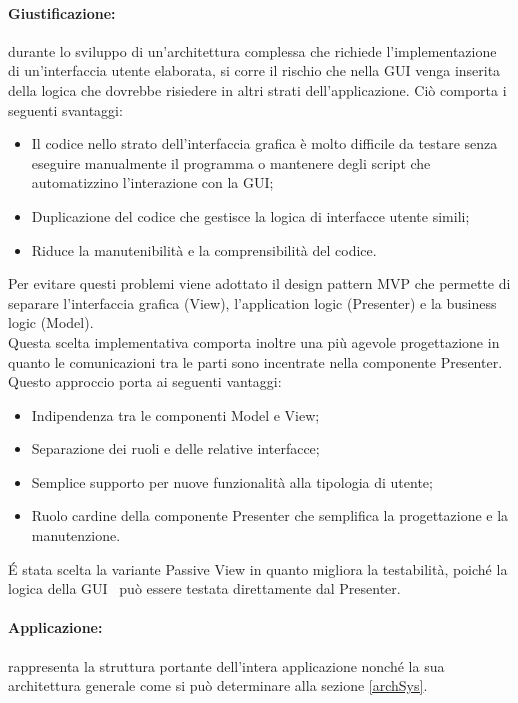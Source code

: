 {{	\paragraph{Giustificazione: }{
	durante lo sviluppo di un'architettura complessa che richiede l'implementazione di un'interfaccia utente elaborata, si corre il rischio che nella GUI venga inserita della logica che dovrebbe risiedere in altri strati dell'applicazione. Ciò comporta i seguenti svantaggi:
	\begin{itemize}
		\item Il codice nello strato dell'interfaccia grafica è molto difficile da testare senza eseguire manualmente il programma o mantenere degli script che automatizzino l'interazione con la GUI\g ;
		\item Duplicazione del codice che gestisce la logica di interfacce utente simili;
		\item Riduce la manutenibilità e la comprensibilità del codice.
	\end{itemize}
Per evitare questi problemi viene adottato il design pattern MVP che permette di separare l'interfaccia grafica (View), l'application logic (Presenter) e la business logic (Model).\\
Questa scelta implementativa comporta inoltre una più agevole progettazione in quanto le comunicazioni tra le parti sono incentrate nella componente Presenter. Questo approccio porta ai seguenti vantaggi:
\begin{itemize}
	\item Indipendenza tra le componenti Model e View;	
	\item Separazione dei ruoli e delle relative interfacce;
	\item Semplice supporto per nuove funzionalità alla tipologia di utente;
	\item Ruolo cardine della componente Presenter che semplifica la progettazione e la manutenzione.
\end{itemize}

\'E stata scelta la variante Passive View in quanto migliora la testabilità, poiché la logica della GUI\g~ può essere testata direttamente dal Presenter.
	
	}
	\paragraph{Applicazione: }{rappresenta la struttura portante dell'intera applicazione nonché la sua architettura generale come si può determinare alla sezione \ref{archSys}.
}
		}

}

